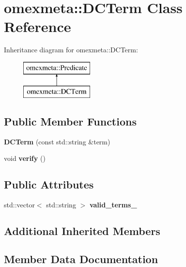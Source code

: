 \hypertarget{classomexmeta_1_1DCTerm}{}\section{omexmeta\+:\+:D\+C\+Term Class Reference}
\label{classomexmeta_1_1DCTerm}
Inheritance diagram for omexmeta\+:\+:D\+C\+Term\+:\begin{figure}[H]
\begin{center}
\leavevmode
\includegraphics[height=2.000000cm]{classomexmeta_1_1DCTerm}
\end{center}
\end{figure}
\subsection*{Public Member Functions}
\begin{DoxyCompactItemize}
\item 
\mbox{\label{classomexmeta_1_1DCTerm_a114081e0845c3f4c306b881da2d065cd}} 
{\bfseries D\+C\+Term} (const std\+::string \&term)
\item 
\mbox{\label{classomexmeta_1_1DCTerm_aae02242702d1bb360c0a1ebb4dae8126}} 
void {\bfseries verify} ()
\end{DoxyCompactItemize}
\subsection*{Public Attributes}
\begin{DoxyCompactItemize}
\item 
std\+::vector$<$ std\+::string $>$ {\bfseries valid\+\_\+terms\+\_\+}
\end{DoxyCompactItemize}
\subsection*{Additional Inherited Members}


\subsection{Member Data Documentation}
\mbox{\label{classomexmeta_1_1DCTerm_a3216c98de5a311d5f824dc132fefc3e4}} 
